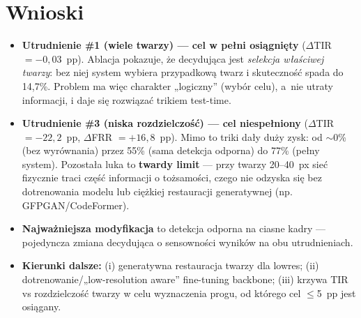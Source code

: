 \documentclass[11pt,a4paper]{article}
\begin{document}
\section{Wnioski}

\begin{itemize}[leftmargin=1.5em]
\item \textbf{Utrudnienie \#1 (wiele twarzy) --- cel w pełni osiągnięty} ($\Delta$TIR
$=-0{,}03$~pp). Ablacja pokazuje, że decydująca jest \emph{selekcja właściwej twarzy}: bez niej
system wybiera przypadkową twarz i skuteczność spada do 14{,}7\%. Problem ma więc charakter
„logiczny” (wybór celu), a~nie utraty informacji, i daje się rozwiązać trikiem test-time.

\item \textbf{Utrudnienie \#3 (niska rozdzielczość) --- cel niespełniony} ($\Delta$TIR
$=-22{,}2$~pp, $\Delta$FRR $=+16{,}8$~pp). Mimo to triki dały duży zysk: od $\sim$0\% (bez
wyrównania) przez 55\% (sama detekcja odporna) do 77\% (pełny system). Pozostała luka to
\textbf{twardy limit} --- przy twarzy 20--40~px sieć fizycznie traci część informacji o
tożsamości, czego nie odzyska się bez dotrenowania modelu lub ciężkiej restauracji
generatywnej (np. GFPGAN/CodeFormer).

\item \textbf{Najważniejsza modyfikacja} to detekcja odporna na ciasne kadry --- pojedyncza
zmiana decydująca o sensowności wyników na obu utrudnieniach.

\item \textbf{Kierunki dalsze:} (i) generatywna restauracja twarzy dla lowres; (ii)
dotrenowanie/„low-resolution aware” fine-tuning backbone; (iii) krzywa TIR vs rozdzielczość
twarzy w celu wyznaczenia progu, od którego cel $\le$5~pp jest osiągany.
\end{itemize}
\end{document}
